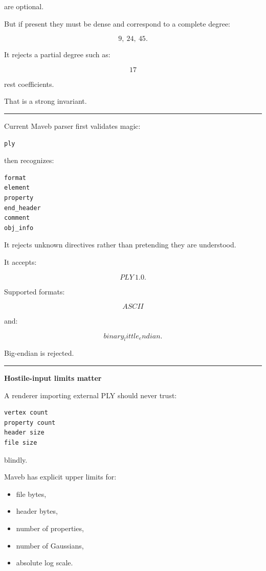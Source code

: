 are optional.

But if present they must be dense and correspond to a complete degree:

\[
9,\ 24,\ 45.
\]

It rejects a partial degree such as:

\[
17
\]

rest coefficients.

That is a strong invariant.

\begin{center}\rule{0.5\linewidth}{0.5pt}\end{center}

Current Maveb parser first validates magic:

\protect{}\label{czuxw1}%
\begin{verbatim}
ply
\end{verbatim}

then recognizes:

\protect{}\label{qlh0ei}%
\begin{verbatim}
format
element
property
end_header
comment
obj_info
\end{verbatim}

It rejects unknown directives rather than pretending they are understood.

It accepts:

\[
PLY\ 1.0.
\]

Supported formats:

\[
ASCII
\]

and:

\[
binary_little_endian.
\]

Big-endian is rejected.

\begin{center}\rule{0.5\linewidth}{0.5pt}\end{center}

\textbf{Hostile-input limits matter}

A renderer importing external PLY should never trust:

\protect{}\label{ye44ct}%
\begin{verbatim}
vertex count
property count
header size
file size
\end{verbatim}

blindly.

Maveb has explicit upper limits for:

\begin{itemize}
\tightlist
\item
  file bytes,
\item
  header bytes,
\item
  number of properties,
\item
  number of Gaussians,
\item
  absolute log scale.
\end{itemize}


